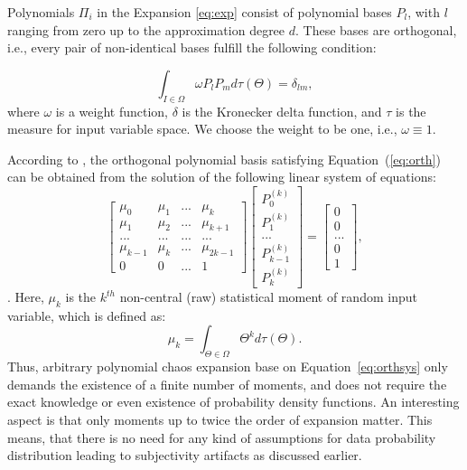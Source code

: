 


Polynomials $\Pi_i$ in the Expansion \ref{eq:exp} consist of polynomial bases
$P_l$, with $l$ ranging from zero up to the approximation degree $d$. These
bases are orthogonal, i.e., every pair of non-identical bases fulfill the
following condition:

\begin{equation}
\int_{I\in\Omega}\omega
P_{l}P_{m}d\tau(\Theta)=\delta_{lm},\label{eq:orth}\end{equation} where $\omega$
is a weight function, $\delta$ is the Kronecker delta function, and $\tau$ is
the measure for input variable space. We choose the weight to be one, i.e.,
$\omega\equiv1$. 

According to \cite{oladyshkin2011concept}, the orthogonal polynomial basis
satisfying Equation~(\ref{eq:orth}) can be obtained from the solution of the
following linear system of equations: 
%
\begin{equation}
\left[\begin{array}{cccc}
\mu_{0} & \mu_{1} & ... & \mu_{k}\\
\mu_{1} & \mu_{2} & ... & \mu_{k+1}\\
... & ... & ... & ...\\
\mu_{k-1} & \mu_{k} & ... & \mu_{2k-1}\\
0 & 0 & ... & 1\end{array}\right]\left[\begin{array}{c}
P_{0}^{(k)}\\
P_{1}^{(k)}\\
...\\
P_{k-1}^{(k)}\\
P_{k}^{(k)}\end{array}\right]=\left[\begin{array}{c}
0\\
0\\
...\\
0\\
1\end{array}\right],\label{eq:orthsys}\end{equation}.
Here, $\mu_{k}$ is the $k^{th}$ non-central (raw) statistical moment of random
input variable, which is defined as:
%
\begin{equation}
\mu_{k}=\int_{\Theta\in\Omega}\Theta^{k}d\tau(\Theta).\label{eq:mnt}
\end{equation}
%
Thus, arbitrary polynomial chaos expansion base on Equation~\ref{eq:orthsys}
only
demands the existence of a finite number of moments, and does not require the
exact knowledge or even existence of probability density functions. An
interesting aspect is that only moments up to twice the order of expansion
matter. This means, that there is no need for any kind of assumptions for data
probability distribution leading to subjectivity artifacts as discussed earlier.

